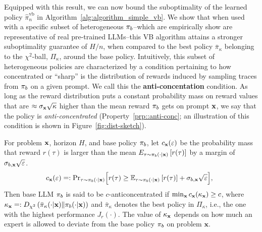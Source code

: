 Equipped with this result, we can now bound the suboptimality of the learned policy $\hat{\pi}_{n}^\mathrm{vb}$ in Algorithm~\ref{alg:algorithm_simple_vb}. We show that when used with a specific subset of heterogeneous $\pi_b$--which are empirically show are representative of real pre-trained LLMs--this VB algorithm attains a stronger suboptimality guarantee of $H/n$, when compared to the best policy $\bar{\pi}_\kappa$ belonging to the $\chi^2$-ball, $\Pi_\kappa$, around the base policy. Intuitively, this subset of heterogeneous policies are characterized by a condition pertaining to how concentrated or ``sharp'' is the distribution of rewards induced by sampling traces from $\pi_b$ on a given prompt. We call this the \textbf{anti-concentation} condition. As long as the reward distribution puts a constant probability mass on reward values that are $\approx \sigma_{\mathbf{x}} \sqrt{\kappa}$ higher than the mean reward $\pi_b$ gets on prompt $\mathbf{x}$, we say that the policy is \emph{anti-concentrated} (Property~\ref{prp::anti-conc}; an illustration of this condition is shown in Figure~\ref{fig:dist-sketch}). 
\vspace{-0.1cm}
{
\begin{tcolorbox}[colback=green!5!white,colframe=black,boxsep=0pt,top=4pt,bottom=4pt,left=3pt,right=3pt]
\begin{property}
\label{prp::anti-conc}
For problem $\mathbf{x}$, horizon $H$, and base policy $\pi_b$, let $c_{\mathbf{x}}(\varepsilon)$ be the probability mass that reward $r(\tau)$ is larger than the mean $E_{\tau \sim \pi_b(\cdot|\mathbf{x})} \left[r(\tau) \right]$ by a margin of  $\sigma_{b, \mathbf{x}}\sqrt{\varepsilon}$. 
{
    \setlength{\abovedisplayskip}{5pt}
    \setlength{\abovedisplayskip}{5pt}
    \begin{align*}
    \!\!\!c_{\mathbf{x}} (\varepsilon) \mathrel{\mathop=}: \text{Pr}_{\tau \sim \pi_b(\cdot|\mathbf{x})} \Big[ r(\tau) \ge \mathbb{E}_{\tau \sim \pi_b(\cdot|\mathbf{x})}\left [ r(\tau) \right ] + \sigma_{b, \mathbf{x}} \sqrt{\varepsilon} \Big],
    \end{align*}
}Then base LLM $\pi_b$ is said to be $c$-anticoncentrated if $\min_{\mathbf{x}} c_{\mathbf{x}}(\kappa_{\mathbf{x}}) \geq c$, where $\kappa_{\mathbf{x}} \mathrel{\mathop=}: D_{\chi^2} \left( \bar{\pi}_\kappa (\cdot|\mathbf{x}) \| \pi_b(\cdot | \mathbf{x}) \right)$ 
and $\bar{\pi}_\kappa$ denotes the best policy in $\Pi_\kappa$, i.e., the one with the highest performance $J_r(\cdot)$. The value of $\kappa_{\mathbf{x}}$ depends on how much an expert is allowed to deviate from the base policy $\pi_b$ on problem $\mathbf{x}$.  
\end{property}
\end{tcolorbox}
}

